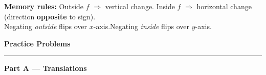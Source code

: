 \documentclass[12pt]{article}
\begin{document}
\begin{mdframed}[backgroundcolor=purplelight,linecolor=purplemain,linewidth=1pt,innerleftmargin=8pt]
\textbf{Memory rules:} Outside $f$ $\Rightarrow$ vertical change.\quad
Inside $f$ $\Rightarrow$ horizontal change (direction \textbf{opposite} to sign).\\
Negating \emph{outside} flips over $x$-axis.\quad Negating \emph{inside} flips over $y$-axis.
\end{mdframed}

\newpage
\begin{center}{\LARGE\textbf{Practice Problems}}\end{center}
\hrule\vspace{0.5em}

\begin{mdframed}[backgroundcolor=purplelight,linecolor=purplemain,linewidth=1.5pt,innerleftmargin=8pt]
{\large\textbf{Part A --- Translations}}
\end{mdframed}
\end{document}
